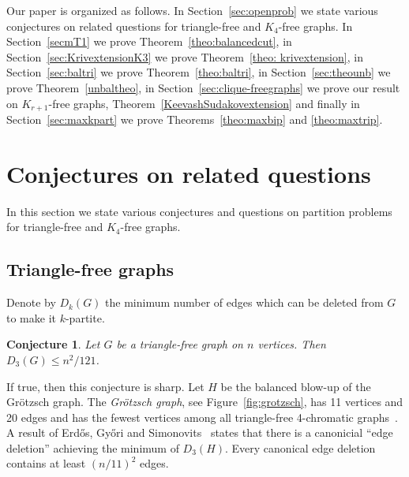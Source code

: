 \documentclass[11pt]{article}
\newtheorem{conj}[theo]{Conjecture}
\theoremstyle{definition}
\numberwithin{theo}{section}
\begin{document}
Our paper is organized as follows. In Section~\ref{sec:openprob} we state various conjectures on related questions for triangle-free and $K_4$-free graphs. In Section~\ref{secmT1} we prove Theorem~\ref{theo:balancedcut}, in Section~\ref{sec:KrivextensionK3} we prove Theorem~\ref{theo: krivextension}, in Section~\ref{sec:baltri} we prove Theorem~\ref{theo:baltri}, in Section~\ref{sec:theounb} we prove Theorem~\ref{unbaltheo}, in Section~\ref{sec:clique-freegraphs} we prove our result on $K_{r+1}$-free graphs, Theorem~\ref{KeevashSudakovextension} and finally in Section~\ref{sec:maxkpart} we prove Theorems~\ref{theo:maxbip} and \ref{theo:maxtrip}. 

\section{Conjectures on related questions}
In this section we state various conjectures and questions on partition problems for triangle-free and $K_4$-free graphs. 
\label{sec:openprob}
\subsection{Triangle-free graphs}





Denote by $D_k(G)$ the minimum number of edges which can be deleted from $G$ to make it $k$-partite. 

\begin{conj}
Let $G$ be a triangle-free graph on $n$ vertices. Then  $D_3(G)\leq n^2/121$.
\end{conj}
If true, then this conjecture is sharp. Let $H$ be the balanced blow-up of the Gr\"otzsch graph. The \emph{Gr\"otzsch graph}, see Figure~\ref{fig:grotzsch}, has 11 vertices and 20 edges and has the fewest vertices among all triangle-free 4-chromatic graphs~\cite{MR0360330}. A result of Erd\H{o}s, Gy\H{o}ri and Simonovits~\cite[Theorem 7]{Howmany} states that there is a canonicial ``edge deletion'' achieving the minimum of $D_3(H)$. Every canonical edge deletion contains at least $(n/11)^2$ edges. 
\end{document}
